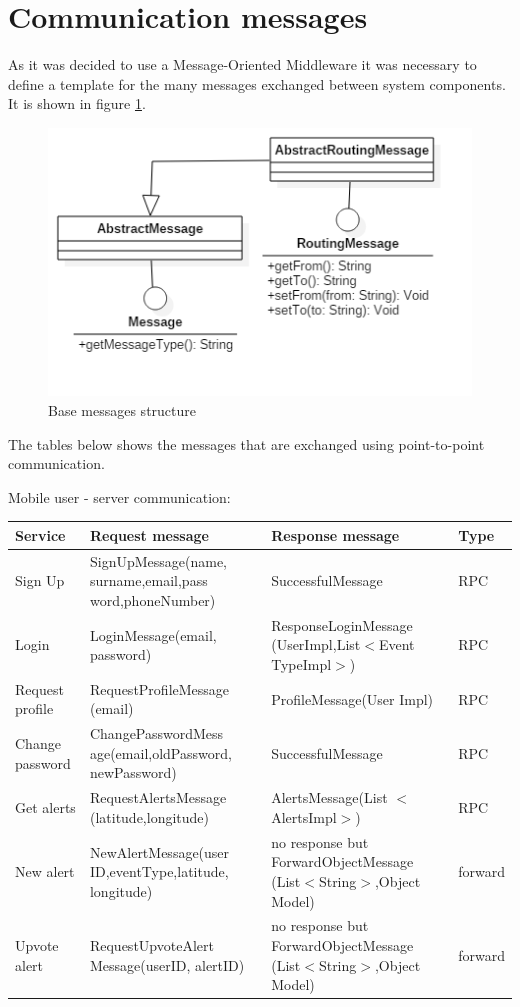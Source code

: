 \documentclass[a4paper,12pt]{report}
\begin{document}
\section{Communication messages}
As it was decided to use a Message-Oriented Middleware it was necessary to define a template for the many messages exchanged between system components. It is shown in figure \ref{fig:messageStruct}.

\begin{figure}[ht]
\centering
\includegraphics[scale=0.5]{figures/messages.png}
\caption{Base messages structure}
\label{fig:messageStruct}
\end{figure}

The tables below shows the messages that are exchanged using point-to-point communication.

Mobile user - server communication:

\begin{center}
\begin{tabular}{ |p{3.5cm}|p{4.6cm}|p{4.6cm}|p{1.3cm}| } 
\hline
Service 			& Request message 	& Response message		& Type 	\\
\hline
Sign Up  			& SignUpMessage(name, surname,email,pass word,phoneNumber)		& SuccessfulMessage 	& RPC	\\ 
Login 				& LoginMessage(email, password) 	& ResponseLoginMessage (UserImpl,List$<$Event TypeImpl$>$)	& RPC	\\ 
Request profile 	& RequestProfileMessage (email)		& ProfileMessage(User Impl)	& RPC	\\ 
Change password		& ChangePasswordMess age(email,oldPassword, newPassword)	& SuccessfulMessage	& RPC	\\
Get alerts		& RequestAlertsMessage (latitude,longitude)	& AlertsMessage(List $<$AlertsImpl$>$)	& RPC	\\
New alert		& NewAlertMessage(user ID,eventType,latitude, longitude)	& no response but ForwardObjectMessage (List$<$String$>$,Object Model)	& forward	\\
Upvote alert		& RequestUpvoteAlert Message(userID, alertID)	& no response but ForwardObjectMessage (List$<$String$>$,Object Model)	& forward	\\
\hline
\end{tabular}
\end{center}
\end{document}
